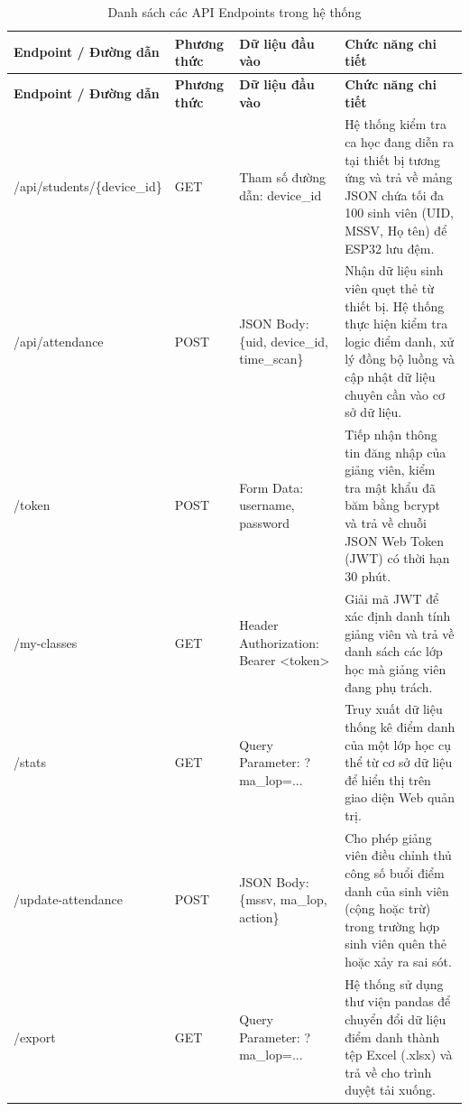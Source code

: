 \documentclass[12pt,a4paper]{report}
\begin{document}
\begin{longtable}{|p{3.5cm}|p{2cm}|p{4cm}|p{6cm}|}
\caption{Danh sách các API Endpoints trong hệ thống} \\

\hline
\textbf{Endpoint / Đường dẫn} & \textbf{Phương thức} & \textbf{Dữ liệu đầu vào} & \textbf{Chức năng chi tiết} \\ 
\hline
\endfirsthead

\hline
\textbf{Endpoint / Đường dẫn} & \textbf{Phương thức} & \textbf{Dữ liệu đầu vào} & \textbf{Chức năng chi tiết} \\ 
\hline
\endhead

/api\allowbreak/students\allowbreak/\{device\_id\} & GET &
Tham số đường dẫn: device\_id &
Hệ thống kiểm tra ca học đang diễn ra tại thiết bị tương ứng và trả về mảng JSON chứa tối đa 100 sinh viên (UID, MSSV, Họ tên) để ESP32 lưu đệm. \\ \hline

/api/attendance & POST &
JSON Body: \{uid, device\_id, time\_scan\} &
Nhận dữ liệu sinh viên quẹt thẻ từ thiết bị. Hệ thống thực hiện kiểm tra logic điểm danh, xử lý đồng bộ luồng và cập nhật dữ liệu chuyên cần vào cơ sở dữ liệu. \\ \hline

/token & POST &
Form Data: username, password &
Tiếp nhận thông tin đăng nhập của giảng viên, kiểm tra mật khẩu đã băm bằng bcrypt và trả về chuỗi JSON Web Token (JWT) có thời hạn 30 phút. \\ \hline

/my-classes & GET &
Header Authorization: Bearer <token> &
Giải mã JWT để xác định danh tính giảng viên và trả về danh sách các lớp học mà giảng viên đang phụ trách. \\ \hline

/stats & GET &
Query Parameter: ?ma\_lop=... &
Truy xuất dữ liệu thống kê điểm danh của một lớp học cụ thể từ cơ sở dữ liệu để hiển thị trên giao diện Web quản trị. \\ \hline

/update-attendance & POST &
JSON Body: \{mssv, ma\_lop, action\} &
Cho phép giảng viên điều chỉnh thủ công số buổi điểm danh của sinh viên (cộng hoặc trừ) trong trường hợp sinh viên quên thẻ hoặc xảy ra sai sót. \\ \hline

/export & GET &
Query Parameter: ?ma\_lop=... &
Hệ thống sử dụng thư viện pandas để chuyển đổi dữ liệu điểm danh thành tệp Excel (.xlsx) và trả về cho trình duyệt tải xuống. \\ \hline

\end{longtable}
\end{document}
